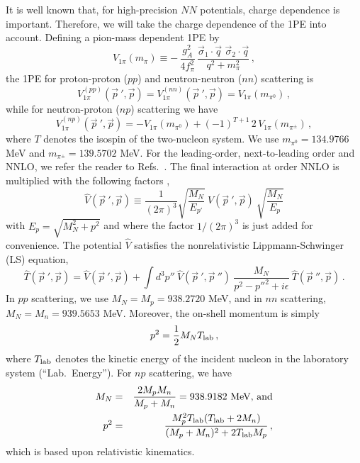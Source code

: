 It is well known that, for high-precision $NN$ potentials,
charge dependence is important.
Therefore, we will 
take the charge dependence of the 1PE into account.
Defining a pion-mass dependent 1PE by
\[
V_{1\pi} (m_\pi) \equiv - \,
\frac{g_A^2}{4f_\pi^2} \,
\frac{
\vec \sigma_1 \cdot \vec q \,\, \vec \sigma_2 \cdot \vec q}
{q^2 + m_\pi^2} 
\,,
\]
the 1PE for proton-proton ($pp$) and neutron-neutron ($nn$)
scattering is
\[
V_{1\pi}^{(pp)} ({\vec p}~', \vec p) = 
V_{1\pi}^{(nn)} ({\vec p}~', \vec p) =
V_{1\pi} (m_{\pi^0}) \,,
\]
while for neutron-proton ($np$) scattering we have
\[
V_{1\pi}^{(np)} ({\vec p}~', \vec p) 
= -V_{1\pi} (m_{\pi^0}) + (-1)^{T+1}\, 2\, V_{1\pi} (m_{\pi^\pm})
\,,
\]
where $T$ denotes the isospin of the two-nucleon system.
We use $m_{\pi^0}=134.9766$ MeV and
 $m_{\pi^\pm}=139.5702$ MeV.
For the leading-order, next-to-leading order and NNLO, we refer the reader to Refs.~\cite{machleidt2011,carlsson2014}.
The final interaction at order NNLO is multiplied with the following factors \cite{machleidt2011},
\begin{equation}
\widehat{V}({\vec p}~',{\vec p})
\equiv 
\frac{1}{(2\pi)^3}
\sqrt{\frac{M_N}{E_{p'}}}\:  
{V}({\vec p}~',{\vec p})\:
 \sqrt{\frac{M_N}{E_{p}}}
\label{eq_minrel1}
\end{equation}
with $E_p=\sqrt{M_N^2+p^2}$ and
where the factor $1/(2\pi)^3$ is just added for convenience.
The potential $\widehat{V}$ satisfies the nonrelativistic
Lippmann-Schwinger (LS) equation,
\begin{equation}
 \widehat{T}({\vec p}~',{\vec p})= \widehat{V}({\vec p}~',{\vec p})+
\int d^3p''\:
\widehat{V}({\vec p}~',{\vec p}~'')\:
\frac{M_N}
{{ p}^{2}-{p''}^{2}+i\epsilon}\:
\widehat{T}({\vec p}~'',{\vec p}) \, .
\label{eq_LS}
\end{equation}
In $pp$ scattering, we use $M_N=M_p=938.2720$ MeV,
and in $nn$ scattering, $M_N=M_n=939.5653$ MeV.
Moreover, the on-shell momentum is simply
\begin{equation}
p^2  =  \frac12 M_N T_{\rm lab} \,,
\end{equation}
where $T_{\rm lab}$ denotes 
the kinetic energy of the incident nucleon 
in the laboratory system (``Lab.\ Energy'').
For $np$ scattering, we have
\begin{eqnarray}
M_N  &=&  \frac{2M_pM_n}{M_p+M_n} = 938.9182 \mbox{ MeV, and}
\\
p^2 & = & \frac{M_p^2 T_{\rm lab} (T_{\rm lab} + 2M_n)}
               {(M_p + M_n)^2 + 2T_{\rm lab} M_p}  
\,,
\end{eqnarray}
which is based upon relativistic kinematics.

